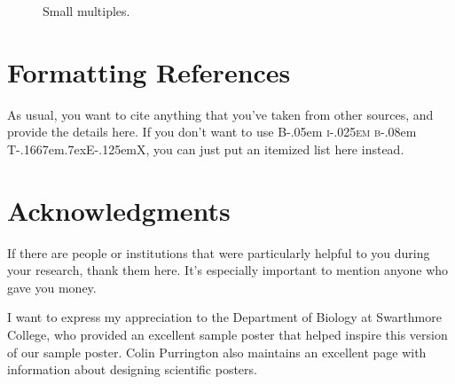 \documentclass[clinic]{hmcposter}
\providecommand{\bibtex}{{\rmfamily B\kern-.05em%
    \textsc{i\kern-.025em b}\kern-.08em%
    T\kern-.1667em\lower.7ex\hbox{E}\kern-.125emX}}
\begin{document}
\begin{poster}
\begin{figure}
{                \label{fig:small-mults-90}%
        }\qquad\qquad
  \caption[Small multiples]{Small multiples.}%
  \label{fig:small-multiples}
\end{figure}






\section{Formatting References}

As usual, you want to cite anything that you've taken from other
sources, and provide the details here.  If you don't want to use
\bibtex, you can just put an itemized list here instead.







\section{Acknowledgments}

If there are people or institutions that were particularly helpful
to you during your research, thank them here.  It's especially
important to mention anyone who gave you money.

I want to express my appreciation to the Department of Biology at
Swarthmore College, who provided an excellent sample poster
\citep{swarthmore-poster} that helped inspire this version of our
sample poster.  Colin Purrington also maintains an excellent page
with information about designing scientific
posters. \citeyearpar{purrington-sciposters}



\end{poster}
\end{document}
